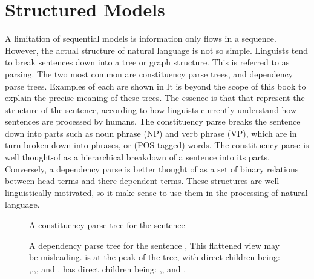\documentclass[12pt,parskip]{komatufte}
\begin{document}
\section{Structured Models}

A limitation of sequential models is information only flows in a sequence.
However, the actual structure of natural language is not so simple.
Linguists tend to break sentences down into a tree or graph structure.
This is referred to as parsing.
The two most common are constituency parse trees, and dependency parse trees.
Examples of each are shown in 
It is beyond the scope of this book to explain the precise meaning of these trees.
The essence is that that represent the structure of the sentence,
according to how linguists currently understand how sentences are processed by humans.
The constituency parse breaks the sentence down into parts such as noun phrase (NP) and verb phrase (VP),
which are in turn broken down into phrases, or (POS tagged) words.
The constituency parse is well thought-of as a hierarchical breakdown of a sentence into its parts.
Conversely, a dependency parse is better thought of as a set of binary relations between head-terms and there dependent terms.
These structures are well linguistically motivated, so it make sense to use them in the processing of natural language.

\begin{figure}
	\caption{A constituency parse tree for the sentence }
	\label{fig:consparse}
\end{figure}


\begin{figure}
	\caption{A dependency parse tree for the sentence ,
	This flattened view may be misleading.
	 is at the peak of the tree, with direct children	being:
	,,,,
	and .
	 has direct children being: ,, and .
}
	\label{fig:depparse}
\end{figure}
\end{document}
